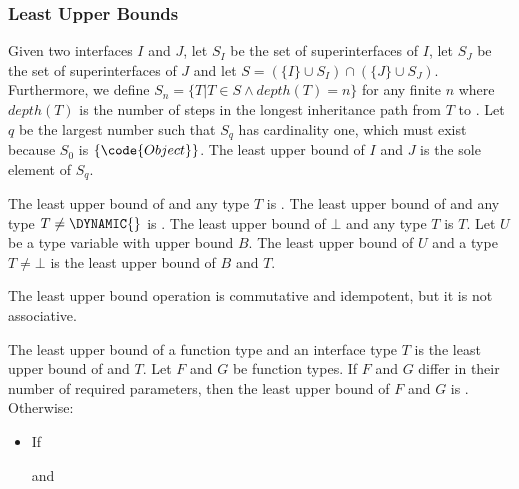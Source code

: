 \documentclass[makeidx]{article}
\begin{document}
{


\subsubsection{Least Upper Bounds}


\LMHash{}%
Given two interfaces $I$ and $J$,
let $S_I$ be the set of superinterfaces of $I$,
let $S_J$ be the set of superinterfaces of $J$
and let $S = (\{I\} \cup S_I) \cap (\{J\} \cup S_J)$.
Furthermore,
we define $S_n = \{T | T \in S \wedge depth(T) = n\}$ for any finite $n$
where $depth(T)$ is the number of steps in the longest inheritance path
from $T$ to .
Let $q$ be the largest number such that $S_q$ has cardinality one,
which must exist because $S_0$ is $\{\code{Object}\}$.
The least upper bound of $I$ and $J$ is the sole element of $S_q$.

\LMHash{}%
The least upper bound of \DYNAMIC{} and any type $T$ is \DYNAMIC{}.
The least upper bound of \VOID{} and any type $T \ne \DYNAMIC{}$ is \VOID{}.
The least upper bound of $\bot$ and any type $T$ is $T$.
Let $U$ be a type variable with upper bound $B$.
The least upper bound of $U$ and a type $T \ne \bot$ is the least upper bound of $B$ and $T$.

\LMHash{}%
The least upper bound operation is commutative and idempotent,
but it is not associative.


\LMHash{}%
The least upper bound of a function type and an interface type $T$ is the least upper bound of \FUNCTION{} and $T$.
Let $F$ and $G$ be function types.
If $F$ and $G$ differ in their number of required parameters,
then the least upper bound of $F$ and $G$ is \FUNCTION{}.
Otherwise:
\begin{itemize}
\item If

 and


\end{itemize}}
\end{document}
